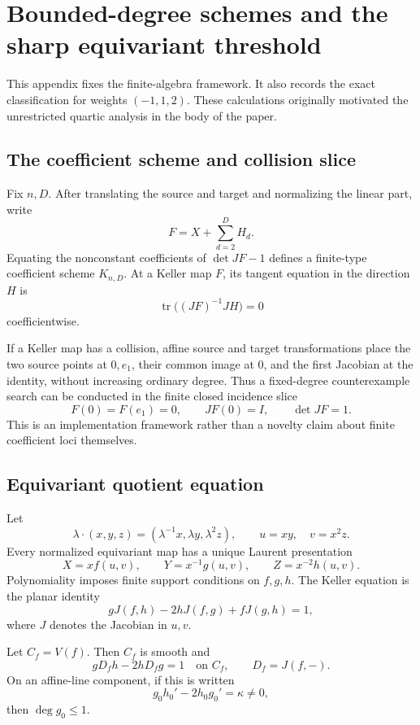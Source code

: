 \section{Bounded-degree schemes and the sharp equivariant threshold}
\label{app:bounded-equivariant}

This appendix fixes the finite-algebra framework.  It also records the exact
classification for weights \((-1,1,2)\).  These calculations originally
motivated the unrestricted quartic analysis in the body of the paper.

\subsection{The coefficient scheme and collision slice}

Fix \(n,D\).  After translating the source and target and normalizing the
linear part, write
\[
F=X+\sum_{d=2}^{D}H_d.
\]
Equating the nonconstant coefficients of \(\det JF-1\) defines a finite-type
coefficient scheme \(K_{n,D}\).  At a Keller map \(F\), its tangent equation
in the direction \(H\) is
\[
\operatorname{tr}\bigl((JF)^{-1}JH\bigr)=0
\]
coefficientwise.

If a Keller map has a collision, affine source and target transformations
place the two source points at \(0,e_1\), their common image at \(0\), and
the first Jacobian at the identity, without increasing ordinary degree.
Thus a fixed-degree counterexample search can be conducted in the finite
closed incidence slice
\[
F(0)=F(e_1)=0,\qquad JF(0)=I,\qquad \det JF=1.
\]
This is an implementation framework rather than a novelty claim about
finite coefficient loci themselves.

\subsection{Equivariant quotient equation}

Let
\[
\lambda\cdot(x,y,z)=(\lambda^{-1}x,\lambda y,\lambda^2z),
\qquad u=xy,\quad v=x^2z.
\]
Every normalized equivariant map has a unique Laurent presentation
\[
X=xf(u,v),\qquad
Y=x^{-1}g(u,v),\qquad
Z=x^{-2}h(u,v).
\]
Polynomiality imposes finite support conditions on \(f,g,h\).  The Keller
equation is the planar identity
\begin{equation}
\label{eq:equivariant-keller}
gJ(f,h)-2hJ(f,g)+fJ(g,h)=1,
\end{equation}
where \(J\) denotes the Jacobian in \(u,v\).

\begin{lemma}
\label{lem:equivariant-boundary}
Let \(C_f=V(f)\).  Then \(C_f\) is smooth and
\[
gD_fh-2hD_fg=1
\quad\text{on }C_f,
\qquad D_f=J(f,-).
\]
On an affine-line component, if this is written
\[
g_0h_0'-2h_0g_0'=\kappa\ne0,
\]
then \(\deg g_0\le1\).
\end{lemma}

